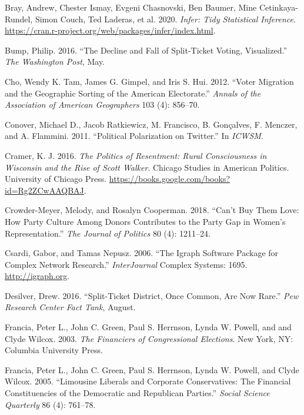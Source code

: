 \documentclass[12pt,]{article}
\begin{document}
\leavevmode\hypertarget{ref-infer}{}%
Bray, Andrew, Chester Ismay, Evgeni Chasnovski, Ben Baumer, Mine
Cetinkaya-Rundel, Simon Couch, Ted Laderas, et al. 2020. \emph{Infer:
Tidy Statistical Inference}.
\url{https://cran.r-project.org/web/packages/infer/index.html}.

\leavevmode\hypertarget{ref-bump2016}{}%
Bump, Philip. 2016. ``The Decline and Fall of Split-Ticket Voting,
Visualized.'' \emph{The Washington Post}, May.

\leavevmode\hypertarget{ref-cho2012}{}%
Cho, Wendy K. Tam, James G. Gimpel, and Iris S. Hui. 2012. ``Voter
Migration and the Geographic Sorting of the American Electorate.''
\emph{Annals of the Association of American Geographers} 103 (4):
856--70.

\leavevmode\hypertarget{ref-conover2011}{}%
Conover, Michael D., Jacob Ratkiewicz, M. Francisco, B. Gonçalves, F.
Menczer, and A. Flammini. 2011. ``Political Polarization on Twitter.''
In \emph{ICWSM}.

\leavevmode\hypertarget{ref-cramer2016}{}%
Cramer, K. J. 2016. \emph{The Politics of Resentment: Rural
Consciousness in Wisconsin and the Rise of Scott Walker}. Chicago
Studies in American Politics. University of Chicago Press.
\url{https://books.google.com/books?id=Rg2ZCwAAQBAJ}.

\leavevmode\hypertarget{ref-crowder-meyer2018}{}%
Crowder-Meyer, Melody, and Rosalyn Cooperman. 2018. ``Can't Buy Them
Love: How Party Culture Among Donors Contributes to the Party Gap in
Women's Representation.'' \emph{The Journal of Politics} 80 (4):
1211--24.

\leavevmode\hypertarget{ref-igraph}{}%
Csardi, Gabor, and Tamas Nepusz. 2006. ``The Igraph Software Package for
Complex Network Research.'' \emph{InterJournal} Complex Systems: 1695.
\url{http://igraph.org}.

\leavevmode\hypertarget{ref-desilver2016}{}%
Desilver, Drew. 2016. ``Split-Ticket District, Once Common, Are Now
Rare.'' \emph{Pew Research Center Fact Tank}, August.

\leavevmode\hypertarget{ref-francia2003}{}%
Francia, Peter L., John C. Green, Paul S. Herrnson, Lynda W. Powell, and
and Clyde Wilcox. 2003. \emph{The Financiers of Congressional
Elections}. New York, NY: Columbia University Press.

\leavevmode\hypertarget{ref-francia2005}{}%
Francia, Peter L., John C. Green, Paul S. Herrnson, Lynda W. Powell, and
Clyde Wilcox. 2005. ``Limousine Liberals and Corporate Conservatives:
The Financial Constituencies of the Democratic and Republican Parties.''
\emph{Social Science Quarterly} 86 (4): 761--78.
\end{document}
